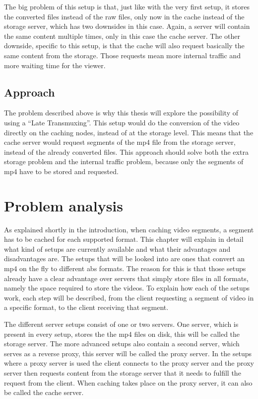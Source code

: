 \documentclass[twoside,openright]{uva-bachelor-thesis}
\begin{document}
The big problem of this setup is that, just like with the very first setup, it
stores the converted files instead of the raw files, only now in the cache
instead of the storage server, which has two downsides in this case. Again, a
server will contain the same content multiple times, only in this case the cache
server. The other downside, specific to this setup, is that the cache will also
request basically the same content from the storage. Those requests mean more
internal traffic and more waiting time for the viewer.

\section{Approach}
The problem described above is why this thesis will explore the possibility of
using a ``Late Transmuxing''. This setup would do the conversion of the video
directly on the caching nodes, instead of at the storage level. This means that
the cache server would request segments of the mp4 file from the storage server,
instead of the already converted files. This approach should solve both the
extra storage problem and the internal traffic problem, because only the segments
of mp4 have to be stored and requested.






\chapter{Problem analysis}
As explained shortly in the introduction, when caching video segments, a segment
has to be cached for each supported format. This chapter will explain in detail
what kind of setups are currently available and what their advantages and
disadvantages are. The setups that will be looked into are ones that convert an
mp4 on the fly to different \gls{abs} formats. The reason for this is that those
setups already have a clear advantage over servers that simply store files in
all formats, namely the space required to store the videos. To explain how each
of the setups work, each step will be described, from the client requesting a
segment of video in a specific format, to the client receiving that segment.

The different server setups consist of one or two servers. One server, which is
present in every setup, stores the the mp4 files on disk, this will be called
the storage server. The more advanced setups also contain a second server, which
serves as a reverse proxy, this server will be called the proxy server. In the
setups where a proxy server is used the client connects to the proxy server and
the proxy server then requests content from the storage server that it needs
to fulfill the request from the client. When caching takes place on the proxy
server, it can also be called the cache server.
\end{document}
